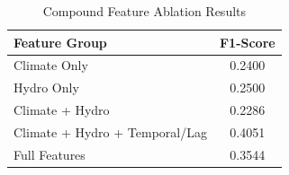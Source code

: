 \begin{table}[htbp]
\centering
\caption{Compound Feature Ablation Results}
\label{tab:ablation}
\begin{tabular}{@{}lc@{}}
\toprule
\textbf{Feature Group} & \textbf{F1-Score} \\
\midrule
Climate Only & 0.2400 \\
Hydro Only & 0.2500 \\
Climate + Hydro & 0.2286 \\
Climate + Hydro + Temporal/Lag & 0.4051 \\
Full Features & 0.3544 \\
\bottomrule
\end{tabular}
\end{table}